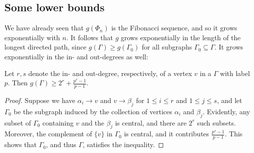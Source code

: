 \subsection{Some lower bounds}
We have already seen that $g(\Phi_n)$ is the Fibonacci sequence, and so it grows exponentially with $n$. It follows that $g$ grows exponentially in the length of the longest directed path, since $g(\Gamma) \ge  g(\Gamma_0)$ for all subgraphs $\Gamma_0 \subseteq \Gamma$. It grows exponentially in the in- and out-degrees as well:
\begin{lem}
	Let $r, s$ denote the in- and out-degree, respectively, of a vertex $v$ in a  $\Gamma$ with label $p$. Then $g(\Gamma) \ge 2^r + \frac{p^s - 1}{p - 1}$.
\end{lem}
\begin{proof}
	Suppose we have $\alpha_i \rightarrow v$ and $v \rightarrow \beta_j$ for $1 \le i \le r$ and $1 \le j \le s$, and let $\Gamma_0$ be the subgraph induced by the collection of vertices $\alpha_i$ and $\beta_j$. Evidently, any subset of $\Gamma_0$ containing $v$ and the $\beta_j$ is central, and there are $2^r$ such subsets. Moreover, the complement of $\{v\}$ in $\Gamma_0$ is central, and it contributes $\frac{p^s - 1}{p - 1}$. This shows that $\Gamma_0$, and thus $\Gamma$, satisfies the inequality.
\end{proof}	
